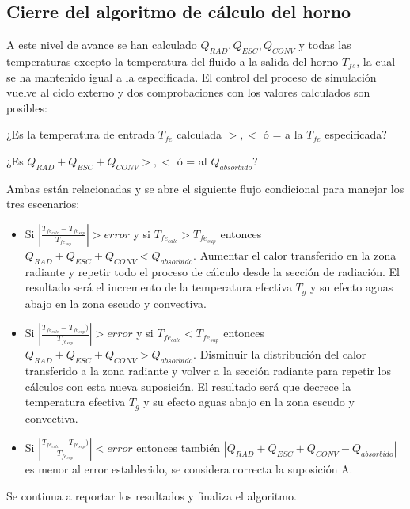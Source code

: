 \subsection{Cierre del algoritmo de cálculo del horno}
\par A este nivel de avance se han calculado $Q_{RAD}, Q_{ESC}, Q_{CONV}$ y todas las temperaturas excepto la temperatura del fluido a la salida del horno $T_{fs}$, la cual se ha mantenido igual a la especificada. El control del proceso de simulación vuelve al ciclo externo y dos comprobaciones con los valores calculados son posibles:\\
\par ¿Es la temperatura de entrada $T_{fe}$ calculada $>, <$ ó = a la $T_{fe}$ especificada?
\par ¿Es $Q_{RAD} + Q_{ESC} + Q_{CONV} >, <$ ó = al $Q_{absorbido}$?\\
\par Ambas están relacionadas y se abre el siguiente flujo condicional para manejar los tres escenarios:
\begin{itemize}
    \item Si $|\frac{T_{fe_{calc}} - T_{fe_{sup}}}{T_{fe_{sup}}} | > error$ y si $T_{fe_{calc}} > T_{fe_{sup}}$ entonces $Q_{RAD} + Q_{ESC} + Q_{CONV} < Q_{absorbido}$. Aumentar el calor transferido en la zona radiante y repetir todo el proceso de cálculo desde la sección de radiación. El resultado será el incremento de la temperatura efectiva $T_{g}$ y su efecto aguas abajo en la zona escudo y convectiva.
    \item Si $|\frac{T_{fe_{calc}} - T_{fe_{sup}})}{T_{fe_{sup}}} | > error$ y si $T_{fe_{calc}} < T_{fe_{sup}}$ entonces $Q_{RAD} + Q_{ESC} + Q_{CONV} > Q_{absorbido}$. Disminuir la distribución del calor transferido a la zona radiante y volver a la sección radiante para repetir los cálculos con esta nueva suposición. El resultado será que decrece la temperatura efectiva $T_{g}$ y su efecto aguas abajo en la zona escudo y convectiva.
    \item Si $|\frac{T_{fe_{calc}} - T_{fe_{sup}})}{T_{fe_{sup}}} | < error$ entonces también $|Q_{RAD} + Q_{ESC} + Q_{CONV} - Q_{absorbido}|$ es menor al error establecido, se considera correcta la suposición A.
\end{itemize}
\par Se continua a reportar los resultados y finaliza el algoritmo.

